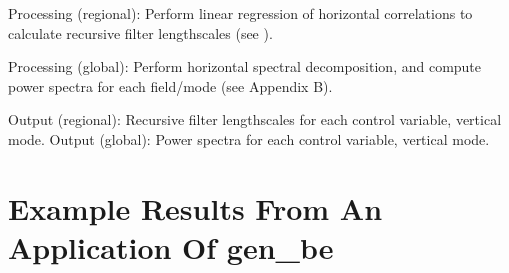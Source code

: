 Processing (regional): Perform linear regression of horizontal correlations to calculate recursive filter lengthscales (see \citet{barker04}).

Processing (global): Perform horizontal spectral decomposition, and compute power spectra for each field/mode (see Appendix B).

Output (regional): Recursive filter lengthscales for each control variable, vertical mode.
Output (global): Power spectra for each control variable, vertical mode.


\section{Example Results From An Application Of gen\_be}



